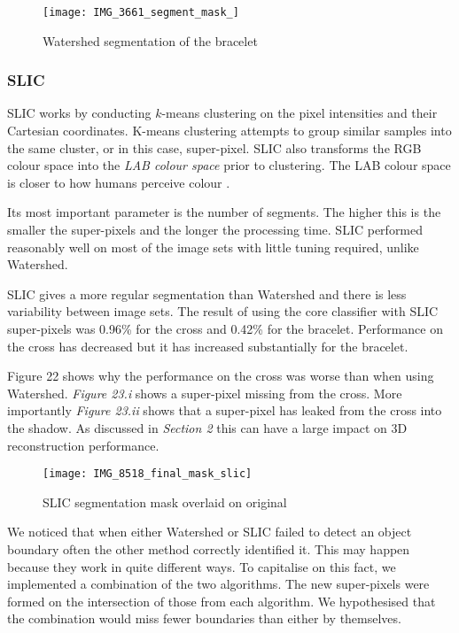\documentclass[12pt]{IIBproject}
\begin{document}
\begin{figure}[H]
  
  \centering
    \texttt{[image: IMG\_3661\_segment\_mask\_]}
\caption{Watershed segmentation of the bracelet}
\end{figure}
\subsubsection{SLIC}
SLIC works by conducting $k$-means clustering on the pixel intensities and their Cartesian coordinates. K-means clustering attempts to group similar samples into the same cluster, or in this case, super-pixel. SLIC also transforms the RGB colour space into the \emph{LAB colour space} prior to clustering. The LAB colour space is closer to how humans perceive colour \cite{mcguire1992reporting}.

 Its most important parameter is the number of segments. The higher this is the smaller the super-pixels and the longer the processing time. SLIC performed reasonably well on most of the image sets with little tuning required, unlike Watershed. 
 
SLIC gives a more regular segmentation than Watershed and there is less variability between image sets. The result of using the core classifier with SLIC super-pixels was 0.96\% for the cross and 0.42\% for the bracelet. Performance on the cross has decreased but it has increased substantially for the bracelet.

Figure 22 shows why the performance on the cross was worse than when using Watershed. \emph{Figure 23.i} shows a super-pixel missing from the cross. More importantly \emph{Figure 23.ii} shows that a super-pixel has leaked from the cross into the shadow. As discussed in \emph{Section 2} this can have a large impact on 3D reconstruction performance.
\begin{figure}[H]
  
  \centering
    \texttt{[image: IMG\_8518\_final\_mask\_slic]}
    \caption{SLIC segmentation mask overlaid on original}
\end{figure}
We noticed that when either Watershed or SLIC failed to detect an object boundary  often the other method correctly identified it. This may happen because they work in quite different ways. To capitalise on this fact, we implemented a combination of the two algorithms. The new super-pixels were formed on the intersection of those from each algorithm. We hypothesised that the combination would miss fewer boundaries than either by themselves. 
\end{document}

